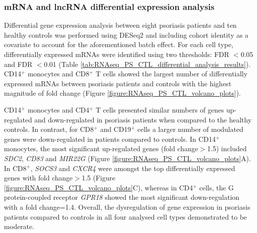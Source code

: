 \subsubsection{mRNA and lncRNA differential expression analysis}

Differential gene expression analysis between eight psoriasis patients and ten healthy controls was performed using DESeq2 and including cohort identity as a covariate to account for the aforementioned batch effect. For each cell type, differentially expressed mRNAs were identified using two thresholds: FDR $<$0.05 and FDR $<$0.01 (Table \ref{tab:RNAseq_PS_CTL_differential_analysis_results}). CD14$^+$ monocytes and CD8$^+$ T cells showed the largest number of differentially expressed mRNAs between psoriasis patients and controls with the highest magnitude of fold change (Figure \ref{figure:RNAseq_PS_CTL_volcano_plots}). %

CD14$^+$ monocytes and CD4$^+$ T cells presented similar numbers of genes up-regulated and down-regulated in psoriasis patients when compared to the healthy controls. In contrast, for CD8$^+$ and CD19$^+$ cells a larger number of modulated genes were down-regulated in patients compared to controls. In CD14$^+$ monocytes, the most significant up-regulated genes (fold change$>$1.5) included \textit{SDC2}, \textit{CD83} and \textit{MIR22G} (Figure \ref{figure:RNAseq_PS_CTL_volcano_plots}A). In CD8$^+$, \textit{SOCS3} and \textit{CXCR4}  were amongst the top differentially expressed genes with fold change$>$1.5 (Figure \ref{figure:RNAseq_PS_CTL_volcano_plots}C), whereas  in CD4$^+$ cells, the G protein-coupled receptor \textit{GPR18} showed the most significant down-regulation with a fold change=1.4.  Overall, the dysregulation of gene expression in psoriasis patients compared to controls in all four analysed cell types demonstrated to be moderate. 

